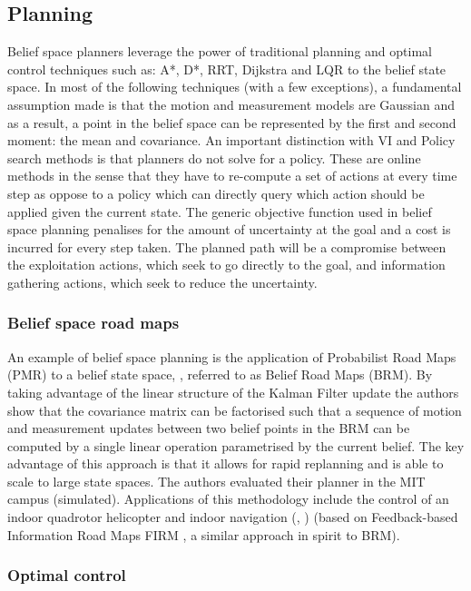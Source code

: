 \subsection{Planning}

Belief space planners leverage the power of traditional planning and optimal control techniques such as: A*, D*, RRT, Dijkstra and LQR to the belief state space. 
In most of the following techniques (with a few exceptions), a fundamental assumption made is that the motion and measurement models are Gaussian 
and as a result, a point in the belief space can be represented by the first and second moment: the mean and covariance. An important distinction with VI and Policy search methods is that planners
do not solve for a policy. These are online methods in the sense that they have to re-compute a set of 
actions at every time step as oppose to a policy which can directly query which action should be applied given the current state. 
The generic objective function used in belief space planning penalises for the amount of uncertainty at the goal and a cost is incurred 
for every step taken. The planned path will be a compromise between the exploitation actions, which seek to go directly to the goal, and information gathering actions, which seek to reduce the uncertainty.

\subsubsection{Belief space road maps}

An example of belief space planning is the application of Probabilist Road Maps (PMR) to a belief state space, \cite{BelRoadMap_2009}, referred to as Belief Road Maps (BRM). By taking advantage of the linear structure of the Kalman Filter update the authors show that the covariance matrix can be factorised such that a sequence of motion and measurement updates between two belief points in the BRM can be computed by a single linear operation parametrised by the current belief. 
The key advantage of this approach is that it allows for rapid replanning and is able to scale to large state spaces. 
The authors evaluated their planner in the MIT campus (simulated). Applications of this methodology include the control of an indoor 
quadrotor helicopter \cite{Quadrator_2008} and indoor navigation (\cite{FIRM_2011}, \cite{rob_online_bs_icra_2014}) 
(based on Feedback-based Information Road Maps FIRM , a similar approach in spirit to BRM).

\subsubsection{Optimal control}

